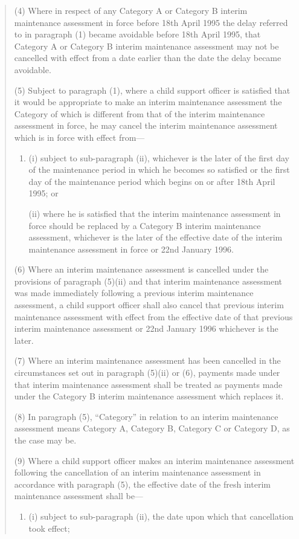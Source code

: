 \documentclass[12pt,a4paper]{article}
\begin{document}
\begin{quotation}
(4) Where in respect of any Category A or Category B interim maintenance assessment in force before 18th April 1995 the delay referred to in paragraph (1) became avoidable before 18th April 1995, that Category A or Category B interim maintenance assessment may not be cancelled with effect from a date earlier than the date the delay became avoidable.

(5) Subject to paragraph (1), where a child support officer is satisfied that it would be appropriate to make an interim maintenance assessment the Category of which is different from that of the interim maintenance assessment in force, he may cancel the interim maintenance assessment which is in force with effect from—
\begin{enumerate}\item[]
(i) subject to sub-paragraph (ii), whichever is the later of the first day of the maintenance period in which he becomes so satisfied or the first day of the maintenance period which begins on or after 18th April 1995; or

(ii) where he is satisfied that the interim maintenance assessment in force should be replaced by a Category B interim maintenance assessment, whichever is the later of the effective date of the interim maintenance assessment in force or 22nd January 1996.
\end{enumerate}

(6) Where an interim maintenance assessment is cancelled under the provisions of paragraph (5)(ii) and that interim maintenance assessment was made immediately following a previous interim maintenance assessment, a child support officer shall also cancel that previous interim maintenance assessment with effect from the effective date of that previous interim maintenance assessment or 22nd January 1996 whichever is the later.

(7) Where an interim maintenance assessment has been cancelled in the circumstances set out in paragraph (5)(ii) or (6), payments made under that interim maintenance assessment shall be treated as payments made under the Category B interim maintenance assessment which replaces it.

(8) In paragraph (5), “Category” in relation to an interim maintenance assessment means Category A, Category B, Category C or Category D, as the case may be.

(9) Where a child support officer makes an interim maintenance assessment following the cancellation of an interim maintenance assessment in accordance with paragraph (5), the effective date of the fresh interim maintenance assessment shall be—
\begin{enumerate}\item[]
(i) subject to sub-paragraph (ii), the date upon which that cancellation took effect;


\end{enumerate}
\end{quotation}
\end{document}

